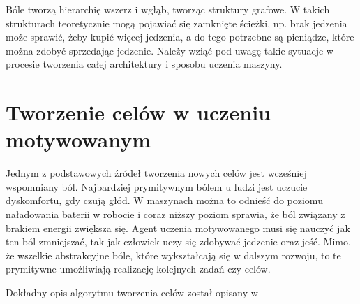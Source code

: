 Bóle tworzą hierarchię wszerz i wgłąb, tworząc struktury grafowe. 
W takich strukturach teoretycznie mogą pojawiać się zamknięte ścieżki, np. brak
jedzenia może sprawić, żeby kupić więcej jedzenia, a do tego potrzebne są 
pieniądze, które można zdobyć sprzedając jedzenie. Należy wziąć pod uwagę takie 
sytuacje w procesie tworzenia całej architektury i sposobu uczenia maszyny.

\section{Tworzenie celów w uczeniu motywowanym}

Jednym z podstawowych źródeł tworzenia nowych celów jest wcześniej wspomniany 
ból. Najbardziej prymitywnym bólem u ludzi jest uczucie dyskomfortu, gdy czują 
głód. W maszynach można to odnieść do poziomu naładowania baterii w robocie i 
coraz niższy poziom sprawia, że ból związany z brakiem energii zwiększa się. 
Agent uczenia motywowanego musi się nauczyć jak ten ból zmniejszać, tak jak 
człowiek uczy się zdobywać jedzenie oraz jeść. Mimo, że wszelkie abstrakcyjne 
bóle, które wykształcają się w dalszym rozwoju, to te prymitywne umożliwiają 
realizację kolejnych zadań czy celów.

Dokładny opis algorytmu tworzenia celów został opisany w 
\cite{ml_comp_int}

